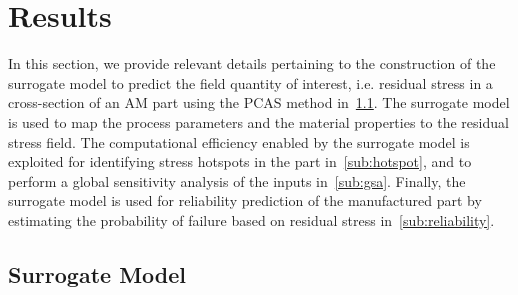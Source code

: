 \section{Results}
\label{sec:results}

In this section, we provide relevant details pertaining to the construction of the surrogate model to predict
the field quantity of interest, i.e. 
residual stress in a cross-section of an  AM part using the PCAS method in~\ref{sub:surr}. The surrogate model is used to map
the process parameters and the material properties to the residual stress field. The computational efficiency
enabled by the surrogate model is exploited for identifying stress hotspots in the part in~\ref{sub:hotspot}, and
to perform a global sensitivity analysis of the inputs in~\ref{sub:gsa}. Finally, the
surrogate model is used for reliability prediction of the manufactured part by estimating the probability of 
failure based on residual stress in~\ref{sub:reliability}.

\subsection{Surrogate Model}
\label{sub:surr}

